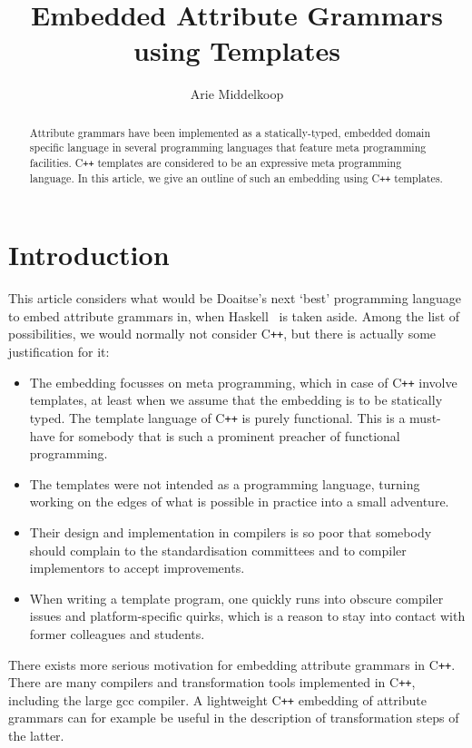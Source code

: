 \documentclass{llncs}
\title{Embedded Attribute Grammars using \Cpp{} Templates}
\author{Arie Middelkoop}
\institute{\email{amiddelk@gmail.com}}
\newcommand*{\Cpp}{C\texttt{++}}
\begin{document}
  \maketitle

  \begin{abstract}
  Attribute grammars have been implemented as a statically-typed,
  embedded domain specific language
  in several programming languages that feature meta programming facilities.
  \Cpp{} templates are considered to be an expressive meta programming language.
  In this article, we give an outline of such an embedding using \Cpp{} templates.
  \end{abstract}
 
\section{Introduction}
\label{sec:introduction}

  This article considers what would be Doaitse's next `best' programming language 
  to embed attribute grammars in, when Haskell~\cite{DBLP:conf/sblp/VieraS12} is taken aside.
  Among the list of possibilities, we would normally not consider \Cpp, but
  there is actually some justification for it:
  \begin{itemize}
  \item The embedding focusses on meta programming, which in case of
    \Cpp{} involve templates, at least when we assume that the embedding
    is to be statically typed.
    The template language of \Cpp{} is purely functional. This is a must-have for
    somebody that is such a prominent preacher of functional programming.
  \item The templates were not intended as a programming language, turning
    working on the edges of what is possible in practice into a small
    adventure.
  \item
    Their design and implementation in compilers is so poor that somebody
    should complain to the standardisation committees and to compiler
    implementors to accept improvements.
  \item
    When writing a template program, one quickly runs into
    obscure compiler issues and platform-specific quirks, which is a
    reason to stay into contact with former colleagues and students.
  \end{itemize}
  There exists more serious motivation for embedding
  attribute grammars in \Cpp. There are many compilers
  and transformation tools implemented in \Cpp, including the
  large gcc compiler. A lightweight \Cpp{}
  embedding of attribute grammars can for example be useful in the
  description of transformation steps of the latter.
\end{document}
